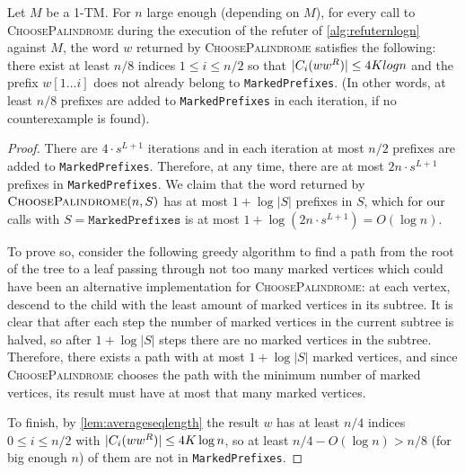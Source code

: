 \begin{lemma}
\label{lem:choosepalindromeshortseq}
Let $M$ be a 1-TM. For $n$ large enough (depending on $M$), for every call to \textsc{ChoosePalindrome}
during the execution of the refuter
of \cref{alg:refuternlogn} against $M$, the word $w$ returned by \textsc{ChoosePalindrome} satisfies the following:
there exist at least $n/8$
indices $1 \leq i \leq n/2$ so that $|C_i(ww^R)| \leq 4K log n$ and the prefix $w[1 \ldots i]$ does not
already belong to \texttt{MarkedPrefixes}. (In other words, at least $n/8$ prefixes are added to \texttt{MarkedPrefixes}
in each iteration, if no counterexample is found).
\end{lemma}
\begin{proof}
There are $4 \cdot s^{L+1}$ iterations and in each iteration at most $n/2$ prefixes are added to \texttt{MarkedPrefixes}.
Therefore, at any time, there are at most $2n \cdot s^{L+1}$ prefixes in \texttt{MarkedPrefixes}. We claim that the 
word returned by $\textsc{ChoosePalindrome}(n, S)$ has at most $1+ \log |S|$  
prefixes in $S$, which for our calls with $S = \texttt{MarkedPrefixes}$ is at most 
$1 + \log(2n \cdot s^{L+1}) = O(\log n)$.

To prove so, consider the following greedy algorithm to find a path from the root of the tree to a leaf
passing through not too many marked vertices 
which could have been an alternative implementation for 
\textsc{ChoosePalindrome}: at each vertex, descend to the child with the least amount of marked vertices 
in its subtree. It is clear that after each step the number of marked vertices in the current subtree is halved,
so after $1 + \log |S|$ steps there are no marked vertices in the subtree. Therefore, there exists a path with
at most $1 + \log |S|$ marked vertices, and since \textsc{ChoosePalindrome} chooses the path with the minimum number of
marked vertices, its result must have at most that many marked vertices.

To finish, by \cref{lem:averageseqlength} the result $w$ has at least $n/4$ indices $0 \leq i \leq n/2$ with 
$|C_i(ww^R)| \leq 4K \log n$, so at least $n/4 - O(\log n) > n/8$ (for big enough $n$) of them are not in 
\texttt{MarkedPrefixes}. 
\end{proof}

